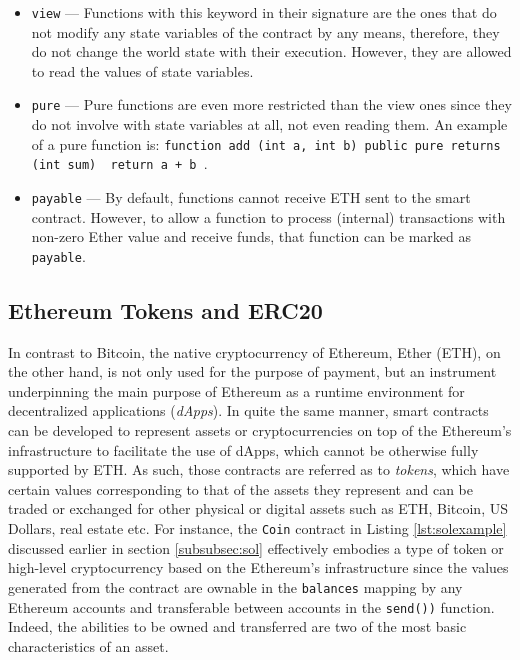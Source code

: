 \begin{description}
\begin{itemize}
	\item \texttt{view} --- Functions with this keyword in their signature are the ones that do not modify any state variables of the contract by any means, therefore, they do not change the world state with their execution. However, they are allowed to read the values of state variables.

	\item \texttt{pure} --- Pure functions are even more restricted than the view ones since they do not involve with state variables at all, not even reading them. An example of a pure function is: \texttt{function add (int a, int b) public pure returns (int sum) { return a + b }}.

	\item \texttt{payable} --- By default, functions cannot receive ETH sent to the smart contract. However, to allow a function to process (internal) transactions with non-zero Ether value and receive funds, that function can be marked as \texttt{payable}.

\end{itemize} 

\end{description}


\subsection{Ethereum Tokens and ERC20 } \label{subsec:tokenerc20}

In contrast to Bitcoin, the native cryptocurrency of Ethereum, Ether (ETH), on the other hand, is not only used for the purpose of payment, but an instrument underpinning the main purpose of Ethereum as a runtime environment for decentralized applications (\textit{dApps}). In quite the same manner, smart contracts can be developed to represent assets or cryptocurrencies on top of the Ethereum's infrastructure to facilitate the use of dApps, which cannot be otherwise fully supported by ETH. As such, those contracts are referred as to \textit{tokens}, which have certain values corresponding to that of the assets they represent and can be traded or exchanged for other physical or digital assets such as ETH, Bitcoin, US Dollars, real estate etc. For instance, the \texttt{Coin} contract in Listing \ref{lst:solexample} discussed earlier in section \ref{subsubsec:sol} effectively embodies a type of token or high-level cryptocurrency based on the Ethereum's infrastructure since the values generated from the contract are ownable in the \texttt{balances} mapping by any Ethereum accounts and transferable between accounts in the \texttt{send())} function. Indeed, the abilities to be owned and transferred are two of the most basic characteristics of an asset.

